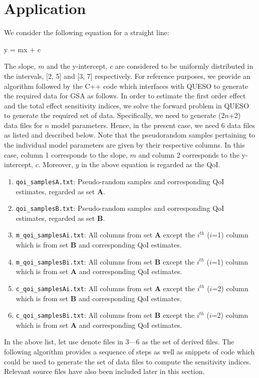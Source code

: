 \section{Application}
\label{sec:app}

We consider the following equation for a straight line:

\be y = mx + c \ee

The slope, $m$ and the y-intercept, $c$ are considered to be uniformly distributed in the intervals,
[2, 5] and [3, 7] respectively. For reference purposes, we provide an algorithm followed by the
C++ code which interfaces with QUESO to generate the required data for GSA as follows.
In order to estimate the first order effect and the total effect sensitivity indices, we solve
the forward problem in QUESO to generate the required set of data. Specifically, we need to generate
(2$n$+2) data files for $n$ model parameters. Hence, in the present case, we need 6 data files as 
listed and described below. Note that the pseudorandom samples pertaining to the  individual model parameters
are given by their respective columns. In this case, column 1 corresponds to the slope, $m$ and column 2
corresponds to the y-intercept, $c$. Moreover, $y$ in the above equation is regarded as the QoI. 

\begin{enumerate}
\item \texttt{qoi\_samplesA.txt}: Pseudo-random samples and corresponding QoI estimates, regarded as set $\bm A$. 
\item \texttt{qoi\_samplesB.txt}: Pseudo-random samples and corresponding QoI estimates, regarded as set $\bm B$.
\item \texttt{m\_qoi\_samplesAi.txt}: All columns from set $\bm A$ except the $i^{th}$ ($i$=1) column which is from
set $\bm B$ and corresponding QoI estimates.
\item \texttt{m\_qoi\_samplesBi.txt}: All columns from set $\bm B$ except the $i^{th}$ ($i$=1) column which is from
set $\bm A$ and corresponding QoI estimates.
\item \texttt{c\_qoi\_samplesAi.txt}: All columns from set $\bm A$ except the $i^{th}$ ($i$=2) column which is from
set $\bm B$ and corresponding QoI estimates.
\item \texttt{c\_qoi\_samplesBi.txt}: All columns from set $\bm B$ except the $i^{th}$ ($i$=2) column which is from
set $\bm A$ and corresponding QoI estimates.
\end{enumerate}

In the above list, let use denote files in 3---6 as the set of derived files.  The following algorithm provides
a sequence of steps as well as snippets of code which could be used to
generate the set of data files to compute the sensitivity indices. Relevant source
files have also been included later in this section.  

